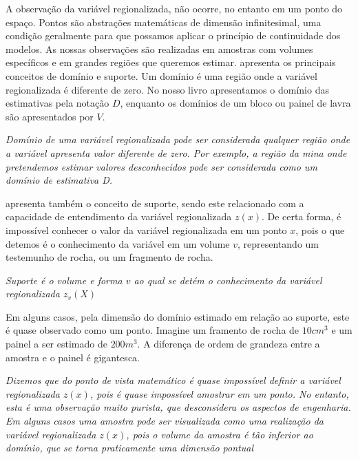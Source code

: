 A observação da variável regionalizada, não ocorre, no entanto em um ponto do espaço. Pontos são abstrações matemáticas de dimensão infinitesimal, uma condição geralmente para que possamos aplicar o princípio de continuidade dos modelos. As nossas observações são realizadas em amostras com volumes específicos e em grandes regiões que queremos estimar. \citet{matheron1963principles} apresenta os principais conceitos de domínio e suporte. Um domínio é uma região onde a variável regionalizada é diferente de zero. No nosso livro apresentamos o domínio das estimativas pela notação $D$, enquanto os domínios de um bloco ou painel de lavra são apresentados por $V$.


\begin{definition}[Domínio]
	\textit{Domínio de uma variável regionalizada pode ser considerada qualquer região onde a variável apresenta valor diferente de zero. Por exemplo, a região da mina onde pretendemos estimar valores desconhecidos pode ser considerada como um domínio de estimativa D.}
\end{definition}

\citet{matheron1963principles} apresenta também o conceito de suporte,  sendo este relacionado com a capacidade de entendimento da variável regionalizada $z(x)$. De certa forma, é impossível conhecer o valor da variável regionalizada em um ponto $x$, pois o que detemos é o conhecimento da variável em um volume $v$, representando um testemunho de rocha, ou um fragmento de rocha. 

\begin{definition}[Suporte]
	\textit{Suporte é o volume e forma $v$ ao qual se detém o conhecimento da variável regionalizada $z_{v}(X)$}
\end{definition}

Em alguns casos, pela dimensão do domínio estimado em relação ao suporte, este é quase observado como um ponto. Imagine um framento de rocha de $10cm^{3}$ e um painel a ser estimado de $200m^{3}$. A diferença de ordem de grandeza entre a amostra e o painel é gigantesca.

\begin{proposition}
	\textit{Dizemos que do ponto de vista matemático é quase impossível definir a variável regionalizada $z(x)$, pois é quase impossível amostrar em um ponto. No entanto, esta é uma observação muito purista, que desconsidera os aspectos de engenharia. Em alguns casos uma amostra pode ser visualizada como uma realização da variável regionalizada $z(x)$, pois o volume da amostra é tão inferior ao domínio, que se torna praticamente uma dimensão pontual}
\end{proposition}

